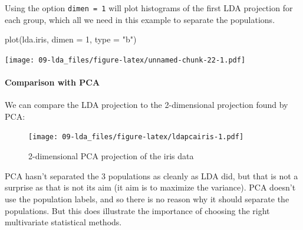 \documentclass[
]{book}
\newenvironment{Shaded}{\begin{snugshade}}{\end{snugshade}}
\newcommand{\AttributeTok}[1]{\textcolor[rgb]{0.77,0.63,0.00}{#1}}
\newcommand{\DecValTok}[1]{\textcolor[rgb]{0.00,0.00,0.81}{#1}}
\newcommand{\FunctionTok}[1]{\textcolor[rgb]{0.00,0.00,0.00}{#1}}
\newcommand{\NormalTok}[1]{#1}
\newcommand{\OtherTok}[1]{\textcolor[rgb]{0.56,0.35,0.01}{#1}}
\newcommand{\SpecialCharTok}[1]{\textcolor[rgb]{0.00,0.00,0.00}{#1}}
\newcommand{\StringTok}[1]{\textcolor[rgb]{0.31,0.60,0.02}{#1}}
\theoremstyle{definition}
\theoremstyle{definition}
\theoremstyle{definition}
\theoremstyle{definition}
\theoremstyle{remark}
\begin{document}
Using the option \texttt{dimen\ =\ 1} will plot histograms of the first LDA projection for each group, which all we need in this example to separate the populations.

\begin{Shaded}
\begin{Highlighting}[]
\FunctionTok{plot}\NormalTok{(lda.iris, }\AttributeTok{dimen =} \DecValTok{1}\NormalTok{, }\AttributeTok{type =} \StringTok{"b"}\NormalTok{)}
\end{Highlighting}
\end{Shaded}

\texttt{[image: 09-lda\_files/figure-latex/unnamed-chunk-22-1.pdf]}

\hypertarget{comparison-with-pca}{%
\paragraph*{Comparison with PCA}\label{comparison-with-pca}}

We can compare the LDA projection to the 2-dimensional projection found by PCA:

\begin{Shaded}
\end{Shaded}

\begin{figure}
\centering
\texttt{[image: 09-lda\_files/figure-latex/ldapcairis-1.pdf]}
\caption{\label{fig:ldapcairis}2-dimensional PCA projection of the iris data}
\end{figure}

PCA hasn't separated the 3 populations as cleanly as LDA did, but that is not a surprise as that is not its aim (it aim is to maximize the variance). PCA doesn't use the population labels, and so there is no reason why it should separate the populations. But this does illustrate the importance of choosing the right multivariate statistical methods.
\end{document}
